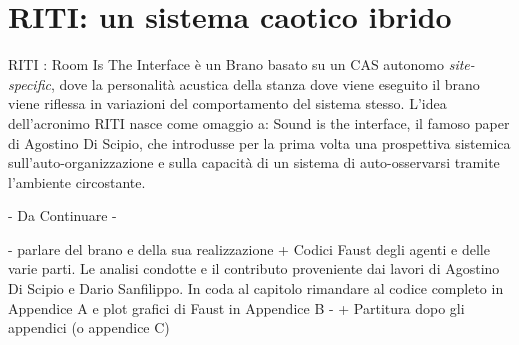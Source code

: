 \section{RITI: un sistema caotico ibrido}
\label{sec:RITI: un sistema caotico ibrido}

RITI : Room Is The Interface è un Brano basato su un CAS autonomo \textit{site-specific},
dove la personalità acustica della stanza dove viene eseguito il brano
viene riflessa in variazioni del comportamento del sistema stesso.
L'idea dell'acronimo RITI nasce come omaggio a: Sound is the interface, 
il famoso paper di Agostino Di Scipio, che introdusse per la prima volta
una prospettiva sistemica sull'auto-organizzazione e sulla capacità
di un sistema di auto-osservarsi tramite l'ambiente circostante. \\

\begin{center} \vspace{0.5cm} \Huge - Da Continuare - \normalsize \vspace{0.5cm} \end{center}

- parlare del brano e della sua realizzazione +
Codici Faust degli agenti e delle varie parti.
Le analisi condotte e il contributo proveniente dai lavori
di Agostino Di Scipio e Dario Sanfilippo.
In coda al capitolo rimandare al codice completo in Appendice A e plot
grafici di Faust in Appendice B -
+ Partitura dopo gli appendici (o appendice C)